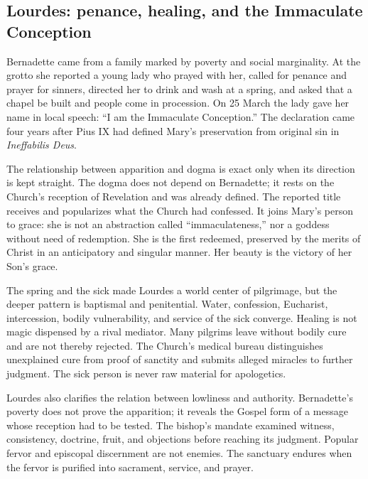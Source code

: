 \subsection{Lourdes: penance, healing, and the Immaculate Conception}


Bernadette came from a family marked by poverty and social marginality. At the grotto she reported a young lady who prayed with her, called for penance and prayer for sinners, directed her to drink and wash at a spring, and asked that a chapel be built and people come in procession. On 25 March the lady gave her name in local speech: ``I am the Immaculate Conception.'' The declaration came four years after Pius IX had defined Mary's preservation from original sin in \emph{Ineffabilis Deus}.

The relationship between apparition and dogma is exact only when its direction is kept straight. The dogma does not depend on Bernadette; it rests on the Church's reception of Revelation and was already defined. The reported title receives and popularizes what the Church had confessed. It joins Mary's person to grace: she is not an abstraction called ``immaculateness,'' nor a goddess without need of redemption. She is the first redeemed, preserved by the merits of Christ in an anticipatory and singular manner. Her beauty is the victory of her Son's grace.

The spring and the sick made Lourdes a world center of pilgrimage, but the deeper pattern is baptismal and penitential. Water, confession, Eucharist, intercession, bodily vulnerability, and service of the sick converge. Healing is not magic dispensed by a rival mediator. Many pilgrims leave without bodily cure and are not thereby rejected. The Church's medical bureau distinguishes unexplained cure from proof of sanctity and submits alleged miracles to further judgment. The sick person is never raw material for apologetics.

Lourdes also clarifies the relation between lowliness and authority. Bernadette's poverty does not prove the apparition; it reveals the Gospel form of a message whose reception had to be tested. The bishop's mandate examined witness, consistency, doctrine, fruit, and objections before reaching its judgment. Popular fervor and episcopal discernment are not enemies. The sanctuary endures when the fervor is purified into sacrament, service, and prayer.

